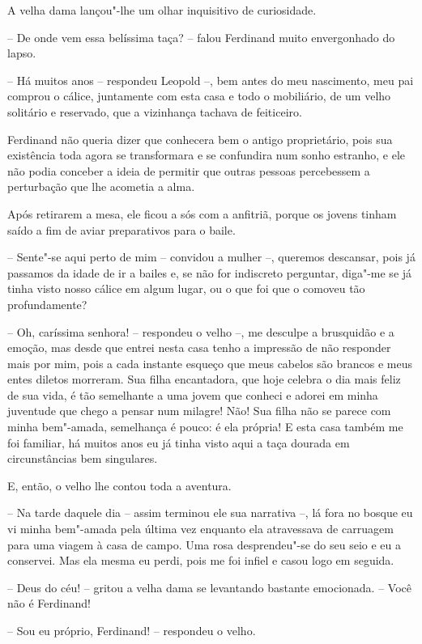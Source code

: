 A velha dama lançou"-lhe um olhar inquisitivo de curiosidade. 

-- De onde vem essa belíssima taça? -- falou Ferdinand muito
envergonhado do lapso.

-- Há muitos anos -- respondeu Leopold --, bem antes do meu nascimento,
meu pai comprou o cálice, juntamente com esta casa e todo o mobiliário,
de um velho solitário e reservado, que a vizinhança tachava de feiticeiro.

Ferdinand não queria dizer que conhecera bem o antigo proprietário, pois
sua existência toda agora se transformara e se confundira num sonho
estranho, e ele não podia conceber a ideia de permitir que outras
pessoas percebessem a perturbação que lhe acometia a alma.

 Após retirarem a mesa, ele ficou a sós com a anfitriã, porque os jovens
tinham saído a fim de aviar preparativos para o baile. 

-- Sente"-se aqui perto de mim -- convidou a mulher --, queremos
descansar, pois já passamos da idade de ir a bailes e, se não for
indiscreto perguntar, diga"-me se já tinha visto nosso cálice em algum
lugar, ou o que foi que o comoveu tão profundamente?

-- Oh, caríssima senhora! -- respondeu o velho --, me desculpe a
brusquidão e a emoção, mas desde que entrei nesta casa tenho a
impressão de não responder mais por mim, pois a cada instante esqueço
que meus cabelos são brancos e meus entes diletos morreram. Sua filha
encantadora, que hoje celebra o dia mais feliz de sua vida, é tão
semelhante a uma jovem que conheci e adorei em minha juventude que
chego a pensar num milagre! Não! Sua filha não se parece com minha
bem"-amada, semelhança é pouco: é ela própria! E esta casa também me foi
familiar, há muitos anos eu já tinha visto aqui a taça dourada em
circunstâncias bem singulares.

E, então, o velho lhe contou toda a aventura. 

-- Na tarde daquele dia -- assim terminou ele sua narrativa --, lá fora
no bosque eu vi minha bem"-amada pela última vez enquanto ela
atravessava de carruagem para uma viagem à casa de campo. Uma rosa
desprendeu"-se do seu seio e eu a conservei. Mas ela mesma eu perdi,
pois me foi infiel e casou logo em seguida.

-- Deus do céu! -- gritou a velha dama se levantando bastante
emocionada. -- Você não é Ferdinand!

-- Sou eu próprio, Ferdinand! -- respondeu o velho.

